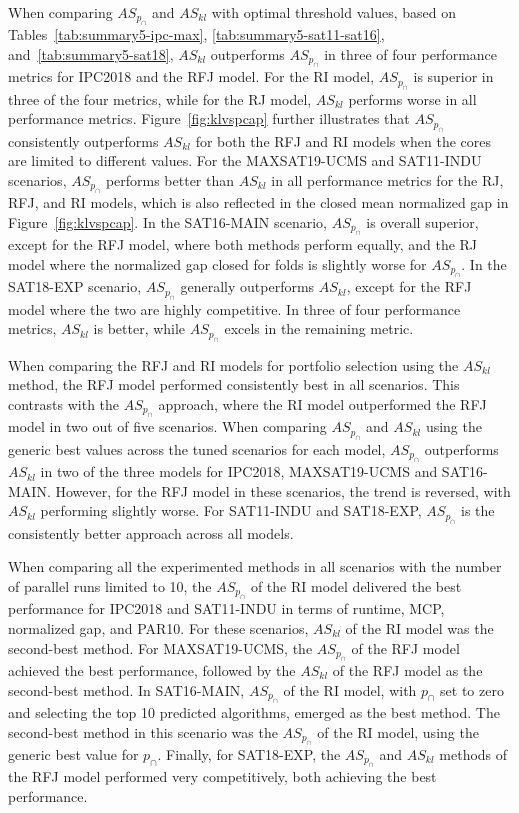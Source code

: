 When comparing $AS_{p_{\cap}}$ and $AS_{kl}$ with optimal threshold values, based on Tables~\ref{tab:summary5-ipc-max}, \ref{tab:summary5-sat11-sat16}, and~\ref{tab:summary5-sat18}, $AS_{kl}$ outperforms $AS_{p_{\cap}}$ in three of four performance metrics for IPC2018 and the RFJ model. For the RI model, $AS_{p_{\cap}}$ is superior in three of the four metrics, while for the RJ model, $AS_{kl}$ performs worse in all performance metrics. Figure~\ref{fig:klvspcap} further illustrates that $AS_{p_{\cap}}$ consistently outperforms $AS_{kl}$ for both the RFJ and RI models when the cores are limited to different values. For the MAXSAT19-UCMS and SAT11-INDU scenarios, $AS_{p_{\cap}}$ performs better than $AS_{kl}$ in all performance metrics for the RJ, RFJ, and RI models, which is also reflected in the closed mean normalized gap in Figure~\ref{fig:klvspcap}. In the SAT16-MAIN scenario, $AS_{p_{\cap}}$ is overall superior, except for the RFJ model, where both methods perform equally, and the RJ model where the normalized gap closed for folds is slightly worse for $AS_{p_{\cap}}$. In the SAT18-EXP scenario, $AS_{p_{\cap}}$ generally outperforms $AS_{kl}$, except for the RFJ model where the two are highly competitive. In three of four performance metrics, $AS_{kl}$ is better, while $AS_{p_{\cap}}$ excels in the remaining metric.

When comparing the RFJ and RI models for portfolio selection using the $AS_{kl}$ method, the RFJ model performed consistently best in all scenarios. This contrasts with the $AS_{p_{\cap}}$ approach, where the RI model outperformed the RFJ model in two out of five scenarios. When comparing $AS_{p_{\cap}}$ and $AS_{kl}$ using the generic best values across the tuned scenarios for each model, $AS_{p_{\cap}}$ outperforms $AS_{kl}$ in two of the three models for IPC2018, MAXSAT19-UCMS and SAT16-MAIN. However, for the RFJ model in these scenarios, the trend is reversed, with $AS_{kl}$ performing slightly worse. For SAT11-INDU and SAT18-EXP, $AS_{p_{\cap}}$ is the consistently better approach across all models.

When comparing all the experimented methods in all scenarios with the number of parallel runs limited to 10, the $AS_{p_{\cap}}$ of the RI model delivered the best performance for IPC2018 and SAT11-INDU in terms of runtime, MCP, normalized gap, and PAR10. For these scenarios, $AS_{kl}$ of the RI model was the second-best method. For MAXSAT19-UCMS, the $AS_{p_{\cap}}$ of the RFJ model achieved the best performance, followed by the $AS_{kl}$ of the RFJ model as the second-best method. In SAT16-MAIN, $AS_{p_{\cap}}$ of the RI model, with $p_{\cap}$ set to zero and selecting the top 10 predicted algorithms, emerged as the best method. The second-best method in this scenario was the $AS_{p_{\cap}}$ of the RI model, using the generic best value for $p_{\cap}$. Finally, for SAT18-EXP, the $AS_{p_{\cap}}$ and $AS_{kl}$ methods of the RFJ model performed very competitively, both achieving the best performance. 

